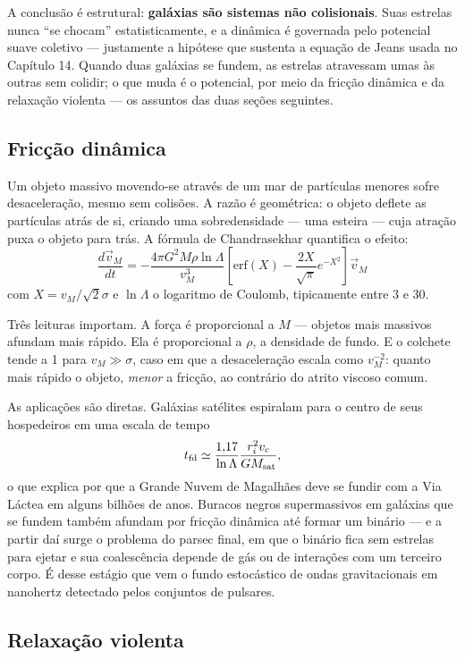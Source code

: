 \documentclass[11pt,a4paper]{article}
\begin{document}
A conclusão é estrutural: \textbf{galáxias são sistemas não colisionais}. Suas estrelas nunca ``se chocam'' estatisticamente, e a dinâmica é governada pelo potencial suave coletivo --- justamente a hipótese que sustenta a equação de Jeans usada no Capítulo 14. Quando duas galáxias se fundem, as estrelas atravessam umas às outras sem colidir; o que muda é o potencial, por meio da fricção dinâmica e da relaxação violenta --- os assuntos das duas seções seguintes.

\subsection*{Fricção dinâmica}

Um objeto massivo movendo-se através de um mar de partículas menores sofre desaceleração, mesmo sem colisões. A razão é geométrica: o objeto deflete as partículas atrás de si, criando uma sobredensidade --- uma esteira --- cuja atração puxa o objeto para trás. A fórmula de Chandrasekhar quantifica o efeito:
\[
\boxed{\ \frac{d\vec{v}_M}{dt}=-\frac{4\pi G^{2}M\rho\ln\Lambda}{v_M^{3}}\left[\mathrm{erf}(X)-\frac{2X}{\sqrt{\pi}}e^{-X^{2}}\right]\vec{v}_M\ }
\]
com $X=v_M/\sqrt{2}\sigma$ e $\ln\Lambda$ o logaritmo de Coulomb, tipicamente entre 3 e 30.

Três leituras importam. A força é proporcional a $M$ --- objetos mais massivos afundam mais rápido. Ela é proporcional a $\rho$, a densidade de fundo. E o colchete tende a 1 para $v_M\gg\sigma$, caso em que a desaceleração escala como $v_M^{-2}$: quanto mais rápido o objeto, \emph{menor} a fricção, ao contrário do atrito viscoso comum.

As aplicações são diretas. Galáxias satélites espiralam para o centro de seus hospedeiros em uma escala de tempo
\[
t_{\rm fd}\simeq\frac{1{,}17}{\ln\Lambda}\frac{r_i^{2}v_c}{GM_{\rm sat}},
\]
o que explica por que a Grande Nuvem de Magalhães deve se fundir com a Via Láctea em alguns bilhões de anos. Buracos negros supermassivos em galáxias que se fundem também afundam por fricção dinâmica até formar um binário --- e a partir daí surge o problema do parsec final, em que o binário fica sem estrelas para ejetar e sua coalescência depende de gás ou de interações com um terceiro corpo. É desse estágio que vem o fundo estocástico de ondas gravitacionais em nanohertz detectado pelos conjuntos de pulsares.

\subsection*{Relaxação violenta}
\end{document}
